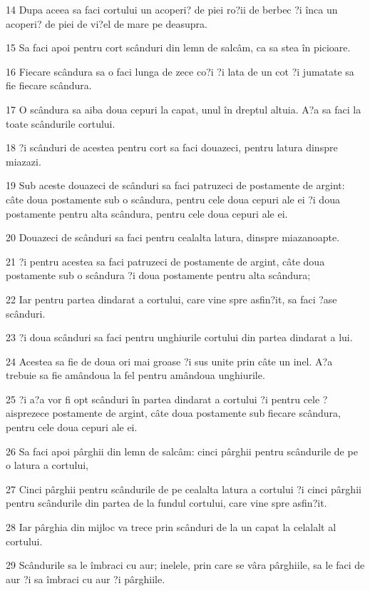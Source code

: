 \par 14 Dupa aceea sa faci cortului un acoperi? de piei ro?ii de berbec ?i înca un acoperi? de piei de vi?el de mare pe deasupra.
\par 15 Sa faci apoi pentru cort scânduri din lemn de salcâm, ca sa stea în picioare.
\par 16 Fiecare scândura sa o faci lunga de zece co?i ?i lata de un cot ?i jumatate sa fie fiecare scândura.
\par 17 O scândura sa aiba doua cepuri la capat, unul în dreptul altuia. A?a sa faci la toate scândurile cortului.
\par 18 ?i scânduri de acestea pentru cort sa faci douazeci, pentru latura dinspre miazazi.
\par 19 Sub aceste douazeci de scânduri sa faci patruzeci de postamente de argint: câte doua postamente sub o scândura, pentru cele doua cepuri ale ei ?i doua postamente pentru alta scândura, pentru cele doua cepuri ale ei.
\par 20 Douazeci de scânduri sa faci pentru cealalta latura, dinspre miazanoapte.
\par 21 ?i pentru acestea sa faci patruzeci de postamente de argint, câte doua postamente sub o scândura ?i doua postamente pentru alta scândura;
\par 22 Iar pentru partea dindarat a cortului, care vine spre asfin?it, sa faci ?ase scânduri.
\par 23 ?i doua scânduri sa faci pentru unghiurile cortului din partea dindarat a lui.
\par 24 Acestea sa fie de doua ori mai groase ?i sus unite prin câte un inel. A?a trebuie sa fie amândoua la fel pentru amândoua unghiurile.
\par 25 ?i a?a vor fi opt scânduri în partea dindarat a cortului ?i pentru cele ?aisprezece postamente de argint, câte doua postamente sub fiecare scândura, pentru cele doua cepuri ale ei.
\par 26 Sa faci apoi pârghii din lemn de salcâm: cinci pârghii pentru scândurile de pe o latura a cortului,
\par 27 Cinci pârghii pentru scândurile de pe cealalta latura a cortului ?i cinci pârghii pentru scândurile din partea de la fundul cortului, care vine spre asfin?it.
\par 28 Iar pârghia din mijloc va trece prin scânduri de la un capat la celalalt al cortului.
\par 29 Scândurile sa le îmbraci cu aur; inelele, prin care se vâra pârghiile, sa le faci de aur ?i sa îmbraci cu aur ?i pârghiile.
